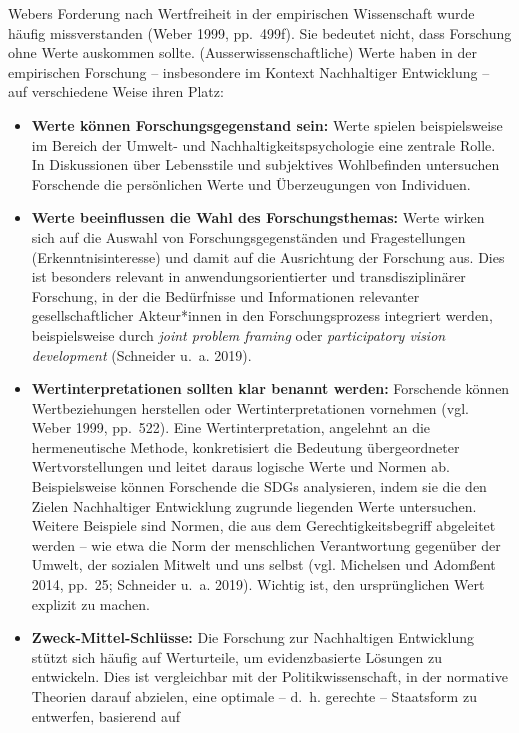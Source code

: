 \documentclass[
  nswissgerman,
  a4paper,
  openany]{book}
\begin{document}
Webers Forderung nach Wertfreiheit in der empirischen Wissenschaft wurde
häufig missverstanden (Weber 1999, pp.~499f). Sie bedeutet nicht, dass
Forschung ohne Werte auskommen sollte. (Ausserwissenschaftliche) Werte
haben in der empirischen Forschung -- insbesondere im Kontext
Nachhaltiger Entwicklung -- auf verschiedene Weise ihren Platz:

\begin{itemize}
\item
  \textbf{Werte können Forschungsgegenstand sein:} Werte spielen
  beispielsweise im Bereich der Umwelt- und Nachhaltigkeitspsychologie
  eine zentrale Rolle. In Diskussionen über Lebensstile und subjektives
  Wohlbefinden untersuchen Forschende die persönlichen Werte und
  Überzeugungen von Individuen.
\item
  \textbf{Werte beeinflussen die Wahl des Forschungsthemas:} Werte
  wirken sich auf die Auswahl von Forschungsgegenständen und
  Fragestellungen (Erkenntnisinteresse) und damit auf die Ausrichtung
  der Forschung aus. Dies ist besonders relevant in
  anwendungsorientierter und transdisziplinärer Forschung, in der die
  Bedürfnisse und Informationen relevanter gesellschaftlicher
  Akteur*innen in den Forschungsprozess integriert werden,
  beispielsweise durch \emph{joint problem framing} oder
  \emph{participatory vision development} (Schneider u.~a. 2019).
\item
  \textbf{Wertinterpretationen sollten klar benannt werden:} Forschende
  können Wertbeziehungen herstellen oder Wertinterpretationen vornehmen
  (vgl. Weber 1999, pp.~522). Eine Wertinterpretation, angelehnt an die
  hermeneutische Methode, konkretisiert die Bedeutung übergeordneter
  Wertvorstellungen und leitet daraus logische Werte und Normen ab.
  Beispielsweise können Forschende die SDGs analysieren, indem sie die
  den Zielen Nachhaltiger Entwicklung zugrunde liegenden Werte
  untersuchen. Weitere Beispiele sind Normen, die aus dem
  Gerechtigkeitsbegriff abgeleitet werden -- wie etwa die Norm der
  menschlichen Verantwortung gegenüber der Umwelt, der sozialen Mitwelt
  und uns selbst (vgl. Michelsen und Adomßent 2014, pp.~25; Schneider
  u.~a. 2019). Wichtig ist, den ursprünglichen Wert explizit zu machen.
\item
  \textbf{Zweck-Mittel-Schlüsse:} Die Forschung zur Nachhaltigen
  Entwicklung stützt sich häufig auf Werturteile, um evidenzbasierte
  Lösungen zu entwickeln. Dies ist vergleichbar mit der
  Politikwissenschaft, in der normative Theorien darauf abzielen, eine
  optimale -- d.~h. gerechte -- Staatsform zu entwerfen, basierend auf

\end{itemize}
\end{document}
